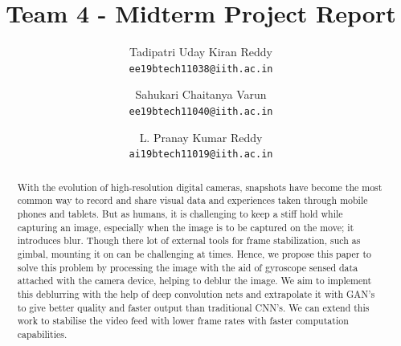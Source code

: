 \documentclass[10pt,twocolumn,letterpaper]{article}
\begin{document}
\title{Team 4 - Midterm Project Report}

\author{Tadipatri Uday Kiran Reddy\\
{\tt\small ee19btech11038@iith.ac.in}
\and
Sahukari Chaitanya Varun\\
{\tt\small ee19btech11040@iith.ac.in}
\and
L. Pranay Kumar Reddy\\
{\tt\small ai19btech11019@iith.ac.in}
}
\maketitle

\begin{abstract}
With the evolution of high-resolution digital cameras, snapshots have become the most common way to record and share visual data and experiences taken through mobile phones and tablets. But as humans, it is challenging to keep a stiff hold while capturing an image, especially when the image is to be captured on the move; it introduces blur. Though there lot of external tools for frame stabilization, such as gimbal, mounting it on can be challenging at times. Hence, we propose this paper to solve this problem by processing the image with the aid of gyroscope sensed data  attached with the camera device, helping to deblur the image. We aim to implement this deblurring with the help of deep convolution nets and extrapolate it with GAN's to give better quality and faster output than  traditional CNN's. We can extend this work to stabilise the video feed with lower frame rates with faster computation capabilities.
\end{abstract}


\label{sec:intro}

\end{document}
